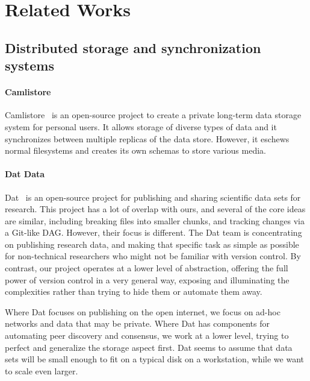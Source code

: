 \section{Related Works}



\subsection{Distributed storage and synchronization systems}


\paragraph{Camlistore}

Camlistore~\cite{camlistore_homepage} is an open-source project to create a private long-term data storage system for personal users.
It allows storage of diverse types of data and it synchronizes between multiple replicas of the data store.
However, it eschews normal filesystems and creates its own schemas to store various media.


\paragraph{Dat Data}

Dat~\cite{dat_homepage} is an open-source project for publishing and sharing scientific data sets for research.
This project has a lot of overlap with ours, and several of the core ideas are similar, including breaking files into smaller chunks, and tracking changes via a Git-like \gls{DAG}.
However, their focus is different.
The Dat team is concentrating on publishing research data, and making that specific task as simple as possible for non-technical researchers who might not be familiar with version control.
By contrast, our project operates at a lower level of abstraction, offering the full power of version control in a very general way, exposing and illuminating the complexities rather than trying to hide them or automate them away.

Where Dat focuses on publishing on the open internet, we focus on ad-hoc networks and data that may be private.
Where Dat has components for automating peer discovery and consensus, we work at a lower level, trying to perfect and generalize the storage aspect first.
Dat seems to assume that data sets will be small enough to fit on a typical disk on a workstation, while we want to scale even larger.

